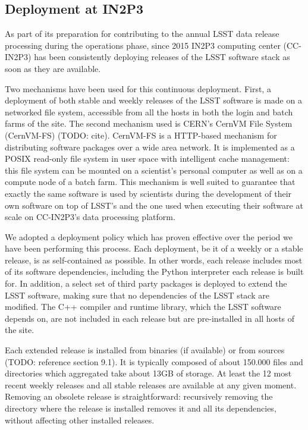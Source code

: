 \subsection{Deployment at IN2P3}

As part of its preparation for contributing to the annual LSST data release processing during the operations phase, since 2015 IN2P3 computing center (CC-IN2P3) has been consistently deploying releases of the LSST software stack as soon as they are available.

Two mechanisms have been used for this continuous deployment. First, a deployment of both stable and weekly releases of the LSST software is made on a networked file system, accessible from all the hosts in both the login and batch farms of the site. The second mechanism used is CERN's CernVM File System (CernVM-FS) (TODO: cite). CernVM-FS is a HTTP-based mechanism for distributing software packages over a wide area network. It is implemented as a POSIX read-only file system in user space with intelligent cache management: this file system can be mounted on a scientist's personal computer as well as on a compute node of a batch farm. This mechanism is well suited to guarantee that exactly the same software is used by scientists during the development of their own software on top of LSST's and the one used when executing their software at scale on CC-IN2P3's data processing platform.

We adopted a deployment policy which has proven effective over the period we have been performing this process. Each deployment, be it of a weekly or a stable release, is as self-contained as possible. In other words, each release includes most of its software dependencies, including the Python interpreter each release is built for. In addition, a select set of third party packages is deployed to extend the LSST software, making sure that no dependencies of the LSST stack are modified. The C++ compiler and runtime library, which the LSST software depends on, are not included in each release but are pre-installed in all hosts of the site.

Each extended release is installed from binaries (if available) or from sources (TODO: reference section 9.1). It is typically composed of about 150.000 files and directories which aggregated take about 13GB of  storage. At least the 12 most recent weekly releases and all stable releases are available at any given moment. Removing an obsolete release is straightforward: recursively removing the directory where the release is installed removes it and all its dependencies, without affecting other installed releases.

